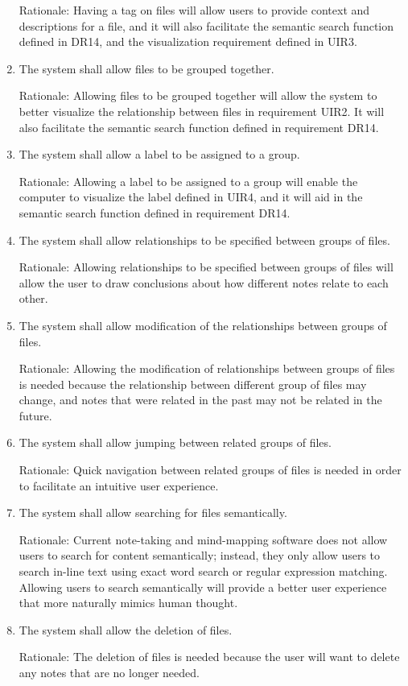 \documentclass{article}
\begin{document}
\begin{enumerate}[DR1]
	Rationale: Having a tag on files will allow users to provide context and descriptions for a file, and it will also facilitate the semantic search function defined in DR14, and the visualization requirement defined in UIR3.
    \item The system shall allow files to be grouped together.

	Rationale: Allowing files to be grouped together will allow the system to better visualize the relationship between files in requirement UIR2. It will also facilitate the semantic search function defined in requirement DR14.
    \item The system shall allow a label to be assigned to a group.

	Rationale: Allowing a label to be assigned to a group will enable the computer to visualize the label defined in UIR4, and it will aid in the semantic search function defined in requirement DR14.
    \item The system shall allow relationships to be specified between groups of files.

	Rationale: Allowing relationships to be specified between groups of files will allow the user to draw conclusions about how different notes relate to each other.
    \item The system shall allow modification of the relationships between groups of files.

	Rationale: Allowing the modification of relationships between groups of files is needed because the relationship between different group of files may change, and notes that were related in the past may not be related in the future.
    \item The system shall allow jumping between related groups of files.

	Rationale: Quick navigation between related groups of files is needed in order to facilitate an intuitive user experience.
    \item The system shall allow searching for files semantically.

	Rationale: Current note-taking and mind-mapping software does not allow users to search for content semantically; instead, they only allow users to search in-line text using exact word search or regular expression matching. Allowing users to search semantically will provide a better user experience that more naturally mimics human thought.

    \item The system shall allow the deletion of files.
	
	Rationale: The deletion of files is needed because the user will want to delete any notes that are no longer needed.
\end{enumerate}
\end{document}
